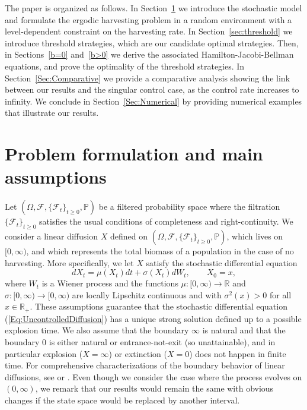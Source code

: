 \documentclass[12pt]{article}
\begin{document}
The paper is organized as follows. In Section~\ref{2} we introduce the stochastic model and formulate the ergodic harvesting problem in a random environment with a level-dependent constraint on the harvesting rate. In Section~\ref{sec:threshold} we introduce threshold strategies, which are our candidate optimal strategies. Then, in Sections~\ref{b=0} and~\ref{b>0} we derive the associated Hamilton-Jacobi-Bellman equations, and prove the optimality of the threshold strategies. In Section~\ref{Sec:Comparative} we provide a comparative analysis showing the link between our results and the singular control case, as the control rate increases to infinity. We conclude in Section~\ref{Sec:Numerical} by providing numerical examples that illustrate our results.


\section{Problem formulation and main assumptions}
\label{2}
Let $(\Omega, \mathcal{F}, \{\mathcal{F}_t\}_{t \geq 0}, \mathbb{P})$ be a filtered probability space where the filtration $\{\mathcal{F}_t\}_{t \geq 0}$ satisfies the usual conditions of completeness and right-continuity. We consider a linear diffusion $X$ defined on $(\Omega, \mathcal{F}, \{\mathcal{F}_t\}_{t \geq 0}, \mathbb{P})$, which lives on $[0,\infty)$, and which represents the total biomass of a population in the case of no harvesting.
More specifically, we let $X$ satisfy
the stochastic differential equation
\begin{equation} \label{Eq:UncontrolledDiffusion}
    dX_t=\mu(X_t)dt+ \sigma(X_t)dW_t, \quad \quad X_0 = x,
\end{equation}
where $W_t$ is a Wiener process and the functions $\mu: [0,\infty) \to \mathbb{R}$ and $\sigma:[0,\infty) \to [0,\infty)$ are locally Lipschitz continuous and with $\sigma^2(x)>0$ for all $x \in \mathbb{R}_+$. These assumptions guarantee that the stochastic differential equation (\ref{Eq:UncontrolledDiffusion}) has a unique strong solution defined up to a possible explosion time. We also assume that the boundary 
$\infty$ is natural and that the boundary $0$ is either natural or entrance-not-exit (so unattainable), and in particular explosion ($X=\infty$) or extinction ($X=0$) does not happen in finite time. 
For comprehensive characterizations of the boundary behavior of linear diffusions, see \cite[pp. 14-21]{BorodinSalminen} or \cite[Chapter 15.6]{Karlin1981}. 
Even though we consider the case where the process evolves on $(0,\infty)$, we remark that our results would remain the same with obvious changes if the state space would be replaced by another interval.
\end{document}
